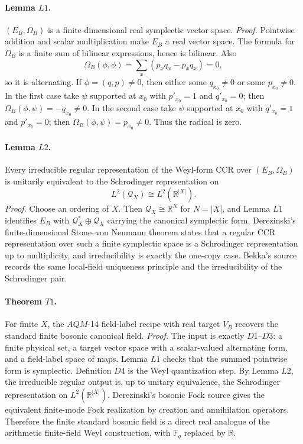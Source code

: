 \paragraph{Lemma \(L1\).}
\((E_B,\Omega_B)\) is a finite-dimensional real symplectic vector space.
\emph{Proof.}
Pointwise addition and scalar multiplication make \(E_B\) a real vector space.
The formula for \(\Omega_B\) is a finite sum of bilinear expressions, hence is
bilinear.  Also
\[
  \Omega_B(\phi,\phi)=\sum_x(p_xq_x-p_xq_x)=0,
\]
so it is alternating.  If \(\phi=(q,p)\ne0\), then either some \(q_{x_0}\ne0\)
or some \(p_{x_0}\ne0\).  In the first case take \(\psi\) supported at \(x_0\)
with \(p'_{x_0}=1\) and \(q'_{x_0}=0\); then
\(\Omega_B(\phi,\psi)=-q_{x_0}\ne0\).  In the second case take \(\psi\)
supported at \(x_0\) with \(q'_{x_0}=1\) and \(p'_{x_0}=0\); then
\(\Omega_B(\phi,\psi)=p_{x_0}\ne0\).  Thus the radical is zero.

\paragraph{Lemma \(L2\).}
Every irreducible regular representation of the Weyl-form CCR over
\((E_B,\Omega_B)\) is unitarily equivalent to the Schrodinger representation on
\[
  L^2(\mathcal Q_X)\cong L^2(\mathbb R^{|X|}).
\]
\emph{Proof.}
Choose an ordering of \(X\).  Then \(\mathcal Q_X\cong\mathbb R^N\) for
\(N=|X|\), and Lemma \(L1\) identifies \(E_B\) with
\(\mathcal Q_X^*\oplus\mathcal Q_X\) carrying the canonical symplectic form.
Derezinski's finite-dimensional Stone--von Neumann theorem states that a
regular CCR representation over such a finite symplectic space is a
Schrodinger representation up to multiplicity, and irreducibility is exactly
the one-copy case.  Bekka's source records the same local-field uniqueness
principle and the irreducibility of the Schrodinger pair.

\paragraph{Theorem \(T1\).}
For finite \(X\), the \(AQM\)-14 field-label recipe with real target \(V_B\)
recovers the standard finite bosonic canonical field.
\emph{Proof.}
The input is exactly \(D1\)--\(D3\): a finite physical set, a target vector
space with a scalar-valued alternating form, and a field-label space of maps.
Lemma \(L1\) checks that the summed pointwise form is symplectic.  Definition
\(D4\) is the Weyl quantization step.  By Lemma \(L2\), the irreducible regular
output is, up to unitary equivalence, the Schrodinger representation on
\(L^2(\mathbb R^{|X|})\).  Derezinski's bosonic Fock source gives the equivalent
finite-mode Fock realization by creation and annihilation operators.  Therefore
the finite standard bosonic field is a direct real analogue of the arithmetic
finite-field Weyl construction, with \(\mathbb F_q\) replaced by \(\mathbb R\).


